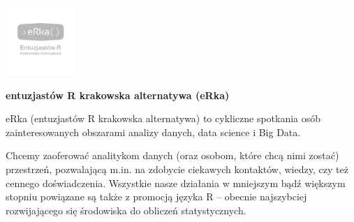 \documentclass[\main/boa.tex]{subfiles}
\begin{document}
	
	\begin{minipage}[t]{0.915\textwidth}
		\center     
		\includegraphics[width=100px]{img/logos.bw/erka.png} 
	\end{minipage}
	
	\Large \textbf {entuzjastów R krakowska alternatywa (eRka)}
	
	
	\vskip 0.3cm
	\normalsize 
	
	
	eRka (entuzjastów R krakowska alternatywa) to cykliczne spotkania osób zainteresowanych obszarami analizy danych, data science i Big Data.
	
	Chcemy zaoferować analitykom danych (oraz osobom, które chcą nimi zostać) przestrzeń, pozwalającą m.in. na zdobycie ciekawych kontaktów, wiedzy, czy też cennego doświadczenia. Wszystkie nasze działania w mniejszym bądź większym stopniu powiązane są także z promocją języka R – obecnie najszybciej rozwijającego się środowiska do obliczeń statystycznych.
	
	\vskip 1.5cm
\end{document}
